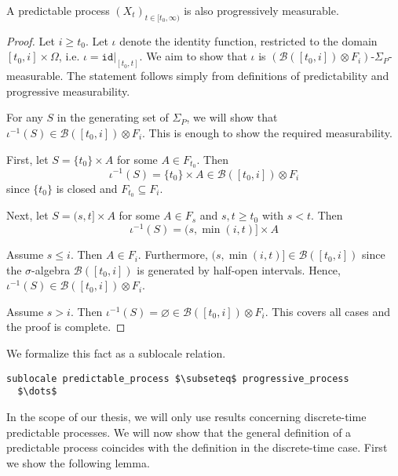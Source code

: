 \begin{lemma}
	A predictable process $(X_t)_{t \in [t_0,\infty)}$ is also progressively measurable.
\end{lemma}
\begin{proof}
	Let $i \ge t_0$. Let $\iota$ denote the identity function, restricted to the domain $[t_0, i] \times \Omega$, i.e. $\iota = \texttt{id}\vert_{[t_0,t]}$. We aim to show that $\iota$ is $(\mathcal{B}([t_0,i]) \otimes F_i)$-$\Sigma_P$-measurable. The statement follows simply from definitions of predictability and progressive measurability.
	
	For any $S$ in the generating set of $\Sigma_P$, we will show that $\iota^{-1}(S) \in \mathcal{B}([t_0,i]) \otimes F_i$. This is enough to show the required measurability.
	
	First, let $S = \{t_0\} \times A$ for some $A \in F_{t_0}$.
	Then
	\[
		\iota^{-1}(S) = \{t_0\} \times A \in \mathcal{B}([t_0,i]) \otimes F_i
	\]
	since $\{t_0\}$ is closed and $F_{t_0} \subseteq F_i$.
	
	Next, let $S = (s,t] \times A$ for some $A \in F_s$ and $s, t \ge t_0$ with $s < t$.
	Then
	\[
		\iota^{-1}(S) = (s, \min(i, t)] \times A
	\]
	
	Assume $s \le i$. Then $A \in F_i$. Furthermore, $(s, \min(i, t)] \in \mathcal{B}([t_0,i])$ since the $\sigma$-algebra $\mathcal{B}([t_0,i])$ is generated by half-open intervals. 
	Hence, $\iota^{-1}(S) \in \mathcal{B}([t_0,i]) \otimes F_i$.
	
	Assume $s > i$. Then $\iota^{-1}(S) = \varnothing \in \mathcal{B}([t_0,i]) \otimes F_i$. This covers all cases and the proof is complete.
\end{proof}

We formalize this fact as a sublocale relation.

\begin{isalemma}
{\small
\begin{lstlisting}[style=isabelle]
sublocale predictable_process $\subseteq$ progressive_process
  $\dots$
\end{lstlisting}
}
\end{isalemma}

In the scope of our thesis, we will only use results concerning discrete-time predictable processes. We will now show that the general definition of a predictable process coincides with the definition in the discrete-time case. First we show the following lemma.

